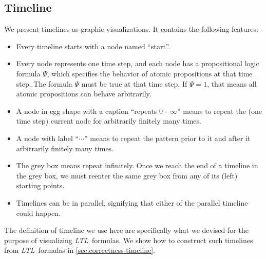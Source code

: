 \documentclass[conference]{IEEEtran}
\theoremstyle{definition}
\theoremstyle{remark}
\newcommand{\ltl}{\textit{LTL}}
\begin{document}
\subsection{Timeline}\label{sec:timeline}
We present timelines as graphic visualizations. It contains the following features:
\begin{itemize}
    \item Every timeline starts with a node named ``start''.
    \item Every node represents one time step, and each node has a propositional logic formula $\Psi$, which specifies the behavior of atomic propositions at that time step. The formula $\Psi$ must be true at that time step. If $\Psi = 1$, that means all atomic propositions can behave arbitrarily.
    \item A node in egg shape with a caption ``repeats $0$ - $\infty$'' means to repeat the (one time step) current node for arbitrarily finitely many times.
    \item A node with label ``$\cdots$'' means to repeat the pattern prior to it and after it arbitrarily finitely many times.
    \item The grey box means repeat infinitely. Once we reach the end of a timeline in the grey box, we must reenter the same grey box from any of its (left) starting points.
    \item Timelines can be in parallel, signifying that either of the parallel timeline could happen.
\end{itemize}

The definition of timeline we use here are specifically what we devised for the purpose of visualizing \ltl\ formulas. We show how to construct such timelines from \ltl\ formulas in \cref{sec:correctness-timeline}.
\end{document}
